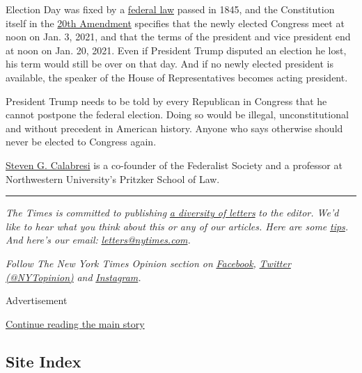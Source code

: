 Election Day was fixed by a
\href{https://www.loc.gov/law/help/statutes-at-large/28th-congress/session-2/c28s2ch1.pdf}{federal
law} passed in 1845, and the Constitution itself in the
\href{https://constitutioncenter.org/interactive-constitution/amendment/amendment-xx}{20th
Amendment} specifies that the newly elected Congress meet at noon on
Jan. 3, 2021, and that the terms of the president and vice president end
at noon on Jan. 20, 2021. Even if President Trump disputed an election
he lost, his term would still be over on that day. And if no newly
elected president is available, the speaker of the House of
Representatives becomes acting president.

President Trump needs to be told by every Republican in Congress that he
cannot postpone the federal election. Doing so would be illegal,
unconstitutional and without precedent in American history. Anyone who
says otherwise should never be elected to Congress again.

\href{https://www.law.northwestern.edu/faculty/profiles/StevenCalabresi/}{Steven
G. Calabresi} is a co-founder of the Federalist Society and a professor
at Northwestern University's Pritzker School of Law.

\begin{center}\rule{0.5\linewidth}{\linethickness}\end{center}

\emph{The Times is committed to publishing}
\href{https://www.nytimes.com/2019/01/31/opinion/letters/letters-to-editor-new-york-times-women.html}{\emph{a
diversity of letters}} \emph{to the editor. We'd like to hear what you
think about this or any of our articles. Here are some}
\href{https://help.nytimes.com/hc/en-us/articles/115014925288-How-to-submit-a-letter-to-the-editor}{\emph{tips}}\emph{.
And here's our email:}
\href{mailto:letters@nytimes.com}{\emph{letters@nytimes.com}}\emph{.}

\emph{Follow The New York Times Opinion section on}
\href{https://www.facebook.com/nytopinion}{\emph{Facebook}}\emph{,}
\href{http://twitter.com/NYTOpinion}{\emph{Twitter (@NYTopinion)}}
\emph{and}
\href{https://www.instagram.com/nytopinion/}{\emph{Instagram}}\emph{.}

Advertisement

\protect\hyperlink{after-bottom}{Continue reading the main story}

\hypertarget{site-index}{%
\subsection{Site Index}\label{site-index}}

